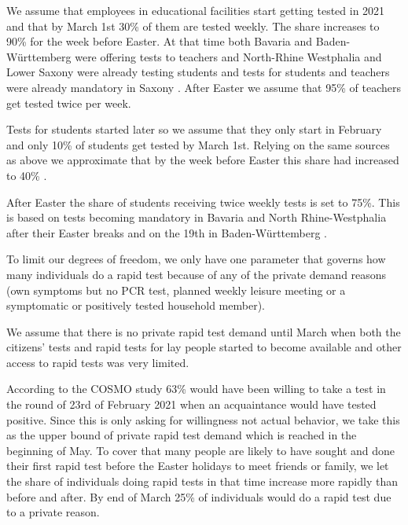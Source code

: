 
We assume that employees in educational facilities start getting tested in 2021 and that
by March 1st 30\% of them are tested weekly. The share increases to 90\% for the week
before Easter. At that time both Bavaria \citep{STMGP2021} and Baden-Württemberg
\citep{MinisteriumKultus2021} were offering tests to teachers and North-Rhine Westphalia
\citep{SchulministeriumNRW2021} and Lower Saxony \citep{NSMK2021} were already testing
students and tests for students and teachers were already mandatory in Saxony
\citep{SMK2021}. After Easter we assume that 95\% of teachers get tested twice per week.

Tests for students started later \citep{MinisteriumKultus2021, SchulministeriumNRW2021}
so we assume that they only start in February and only 10\% of students get tested by
March 1st. Relying on the same sources as above we approximate that by the week before
Easter this share had increased to 40\% \citep{SchulministeriumNRW2021}.

After Easter the share of students receiving twice weekly tests is set to 75\%. This is
based on tests becoming mandatory in Bavaria \citep{BayerischeStaatskanzlei2021} and
North Rhine-Westphalia \citep{SchulministeriumNRW2021b} after their Easter breaks and
on the 19th in Baden-Württemberg \citep{KMBaWue2021}.


To limit our degrees of freedom, we only have one parameter that governs how many
individuals do a rapid test because of any of the private demand reasons (own symptoms
but no PCR test, planned weekly leisure meeting or a symptomatic or positively tested
household member).

We assume that there is no private rapid test demand until March when both the citizens'
tests and rapid tests for lay people started to become available
\citep{Bundesanzeiger2021a, Bundesregierung2021} and other access to rapid tests was very
limited.

According to the COSMO study \citep{Betsch2021a} 63\% would have been willing to take a
test in the round of 23rd of February 2021 when an acquaintance would have tested
positive. Since this is only asking for willingness not actual behavior, we take this as
the upper bound of private rapid test demand which is reached in the beginning of May. To
cover that many people are likely to have sought and done their first rapid test before
the Easter holidays to meet friends or family, we let the share of individuals doing
rapid tests in that time increase more rapidly than before and after. By end of March
25\% of individuals would do a rapid test due to a private reason.

